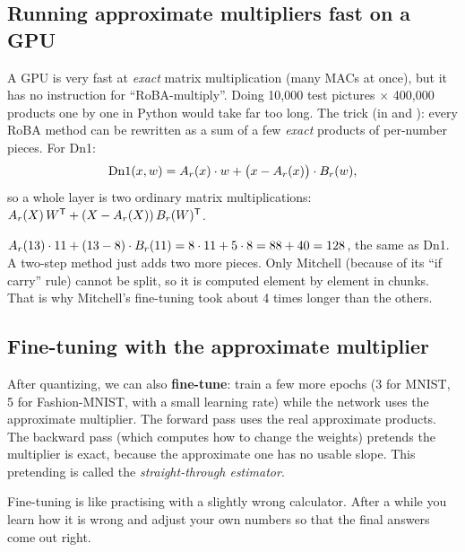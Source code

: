 \subsection{Running approximate multipliers fast on a GPU}\label{sec:factors}

A GPU is very fast at \emph{exact} matrix multiplication (many MACs at once), but it has no instruction
for ``RoBA-multiply''. Doing 10{,}000 test pictures $\times$ 400{,}000 products one by one in Python
would take far too long. The trick (in  and ): every
RoBA method can be rewritten as a sum of a few \emph{exact} products of per-number pieces. For Dn1:
\[
  \text{Dn1}(x,w) = A_r(x)\cdot w + \big(x-A_r(x)\big)\cdot B_r(w),
\]
so a whole layer is two ordinary matrix multiplications:
$A_r(X)\,W^{\mathsf T} + (X-A_r(X))\,B_r(W)^{\mathsf T}$.

\begin{example}
$A_r(13)\cdot 11 + (13-8)\cdot B_r(11) = 8\cdot 11 + 5\cdot 8 = 88+40 = 128$, the same as Dn1. A two-step
method just adds two more pieces. Only Mitchell (because of its ``if carry'' rule) cannot be split,
so it is computed element by element in chunks. That is why Mitchell's fine-tuning took about 4 times
longer than the others.
\end{example}

\subsection{Fine-tuning with the approximate multiplier}

After quantizing, we can also \textbf{fine-tune}: train a few more epochs (3 for MNIST, 5 for
Fashion-MNIST, with a small learning rate) while the network uses the approximate multiplier. The
forward pass uses the real approximate products. The backward pass (which computes how to change the
weights) pretends the multiplier is exact, because the approximate one has no usable slope. This
pretending is called the \emph{straight-through estimator}.

\begin{kid}
Fine-tuning is like practising with a slightly wrong calculator. After a while you learn how it is
wrong and adjust your own numbers so that the final answers come out right.
\end{kid}
\newpage
